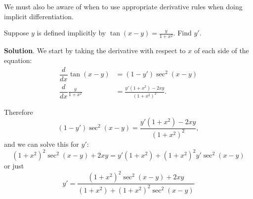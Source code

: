 \documentclass[10pt,]{book}
\theoremstyle{ptxplainnotitle}
\theoremstyle{ptxplaintitle}
\theoremstyle{ptxplainnotitle}
\theoremstyle{ptxplaintitle}
\theoremstyle{ptxplainnotitle}
\theoremstyle{ptxplaintitle}
\theoremstyle{ptxdefinitionnotitle}
\theoremstyle{ptxdefinitiontitle}
\theoremstyle{ptxdefinitionnotitle}
\theoremstyle{ptxdefinitiontitle}
\theoremstyle{ptxdefinitionnotitle}
\theoremstyle{ptxdefinitiontitle}
\theoremstyle{ptxdefinitionnotitle}
\theoremstyle{ptxdefinitiontitle}
\theoremstyle{ptxdefinitionnotitle}
\theoremstyle{ptxdefinitiontitle}
\numberwithin{equation}{section}
\newcommand{\dv}[3][]{\dfrac{d^{#1} #2}{d #3^{#1}}}
\begin{document}
\hypertarget{p-163}{}%
We must also be aware of when to use appropriate derivative rules when doing implicit differentiation.%
\begin{example}\label{example-chain-and-quotient-rule}
\hypertarget{p-164}{}%
Suppose \(y\) is defined implicitly by \(\tan(x-y) = \frac{y}{1+x^{2}}\). Find \(y'\).%
\par\smallskip%
\noindent\textbf{Solution}.\hypertarget{solution-35}{}\quad%
\hypertarget{p-165}{}%
We start by taking the derivative with respect to \(x\) of each side of the equation:%
\begin{align*}
\dv{}{x}\tan(x-y) & = (1-y')\sec^{2}(x-y) \\
\dv{}{x}\frac{y}{1+x^{2}} & = \frac{y'(1+x^{2}) - 2xy}{(1+x^{2})^{2}}. 
\end{align*}
%
\par
\hypertarget{p-166}{}%
Therefore%
\begin{equation*}
(1-y')\sec^{2}(x-y) = \frac{y'(1+x^{2}) - 2xy}{(1+x^{2})^{2}},
\end{equation*}
and we can solve this for \(y'\):%
\begin{equation*}
(1+x^{2})^{2}\sec^{2}(x-y) + 2xy = y'(1+x^{2}) + (1+x^{2})^{2}y'\sec^{2}(x-y)
\end{equation*}
or just%
\begin{equation*}
y' = \frac{(1+x^{2})^{2}\sec^{2}(x-y) + 2xy}{(1+x^{2})+(1+x^{2})^{2}\sec^{2}(x-y)}
\end{equation*}
%
\end{example}
\end{document}
